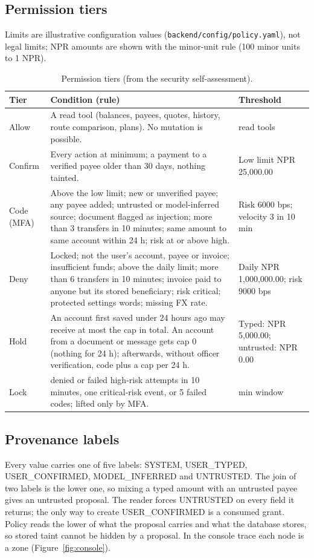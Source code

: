\documentclass[11pt,a4paper]{article}
\newcommand{\code}[1]{\texttt{\small #1}}
\begin{document}
\subsection{Permission tiers}
Limits are illustrative configuration values (\code{backend/\allowbreak config/\allowbreak policy.yaml}), not legal limits; NPR amounts are shown with the minor-unit rule (100 minor units to 1 NPR).
\begin{table}[!tb]
\centering\footnotesize
\caption{Permission tiers (from the security self-assessment).}
\begin{tabularx}{\textwidth}{@{}l>{\raggedright\arraybackslash}X>{\raggedright\arraybackslash}p{4.3cm}@{}}
\toprule
Tier & Condition (rule) & Threshold\\
\midrule
Allow & A read tool (balances, payees, quotes, history, route comparison, plans). No mutation is possible. & 12 read tools\\
Confirm & Every action at minimum; a payment to a verified payee older than 30 days, nothing tainted. & Low limit NPR 25,000.00\\
Code (MFA) & Above the low limit; new or unverified payee; any payee added; untrusted or model-inferred source; document flagged as injection; more than 3 transfers in 10 minutes; same amount to same account within 24 h; risk at or above high. & Risk 6000 bps; velocity 3 in 10 min\\
Deny & Locked; not the user's account, payee or invoice; insufficient funds; above the daily limit; more than 6 transfers in 10 minutes; invoice paid to anyone but its stored beneficiary; risk critical; protected settings words; missing FX rate. & Daily NPR 1,000,000.00; risk 9000 bps\\
Hold & An account first saved under 24 hours ago may receive at most the cap in total. An account from a document or message gets cap 0 (nothing for 24 h); afterwards, without officer verification, code plus a cap per 24 h. & Typed: NPR 5,000.00; untrusted: NPR 0.00\\
Lock & 3 denied or failed high-risk attempts in 10 minutes, one critical-risk event, or 5 failed codes; lifted only by MFA. & 10 min window\\
\bottomrule
\end{tabularx}
\end{table}

\subsection{Provenance labels}
Every value carries one of five labels: \textsf{SYSTEM}, \textsf{USER\_TYPED}, \textsf{USER\_CONFIRMED}, \textsf{MODEL\_INFERRED} and \textsf{UNTRUSTED}. The join of two labels is the lower one, so mixing a typed amount with an untrusted payee gives an untrusted proposal. The reader forces \textsf{UNTRUSTED} on every field it returns; the only way to create \textsf{USER\_CONFIRMED} is a consumed grant. Policy reads the lower of what the proposal carries and what the database stores, so stored taint cannot be hidden by a proposal. In the console trace each node is a zone (Figure~\ref{fig:console}).
\end{document}
